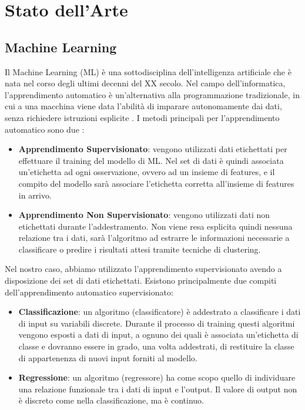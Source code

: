 \chapter{Stato dell'Arte}

\medskip

\section{Machine Learning}

Il Machine Learning (ML) \`e una sottodisciplina dell'intelligenza artificiale che \`e nata nel corso degli ultimi decenni del XX secolo. Nel campo dell'informatica, l'apprendimento automatico \`e un'alternativa alla programmazione tradizionale, in cui a una macchina viene data l'abilit\`a di imparare autonomamente dai dati, senza richiedere istruzioni esplicite \cite{book_ML}. 
I metodi principali per l'apprendimento automatico sono due \cite{ML_sup_unsup}:

\begin{itemize}

  \item \textbf{Apprendimento Supervisionato}: vengono utilizzati dati etichettati per effettuare il training del modello di ML. Nel set di dati \`e quindi associata un'etichetta ad ogni osservazione, ovvero ad un insieme di features, e il compito del modello sar\`a associare l'etichetta corretta all'insieme di features in arrivo.
  
  \item \textbf{Apprendimento Non Supervisionato}: vengono utilizzati dati non etichettati durante l'addestramento. Non viene resa esplicita quindi nessuna relazione tra i dati, sar\`a l'algoritmo ad estrarre le informazioni necessarie a classificare o predire i risultati attesi tramite tecniche di clustering.
    
\end{itemize}

Nel nostro caso, abbiamo utilizzato l'apprendimento supervisionato avendo a disposizione dei set di dati etichettati.
Esistono principalmente due compiti dell'apprendimento automatico supervisionato\cite{wiki_ML}:
\begin{itemize}

  \item \textbf{Classificazione}: un algoritmo (classificatore) \`e addestrato a classificare i dati di input su variabili discrete. Durante il processo di training questi algoritmi vengono esposti a dati di input, a ognuno dei quali \`e associata un'etichetta di classe e dovranno essere in grado, una volta addestrati, di restituire la classe di appartenenza di nuovi input forniti al modello.
  
  \item \textbf{Regressione}: un algoritmo (regressore) ha come scopo quello di individuare una relazione funzionale tra i dati di input e l'output. Il valore di output non \`e discreto come nella classificazione, ma \`e continuo.
    
\end{itemize}



